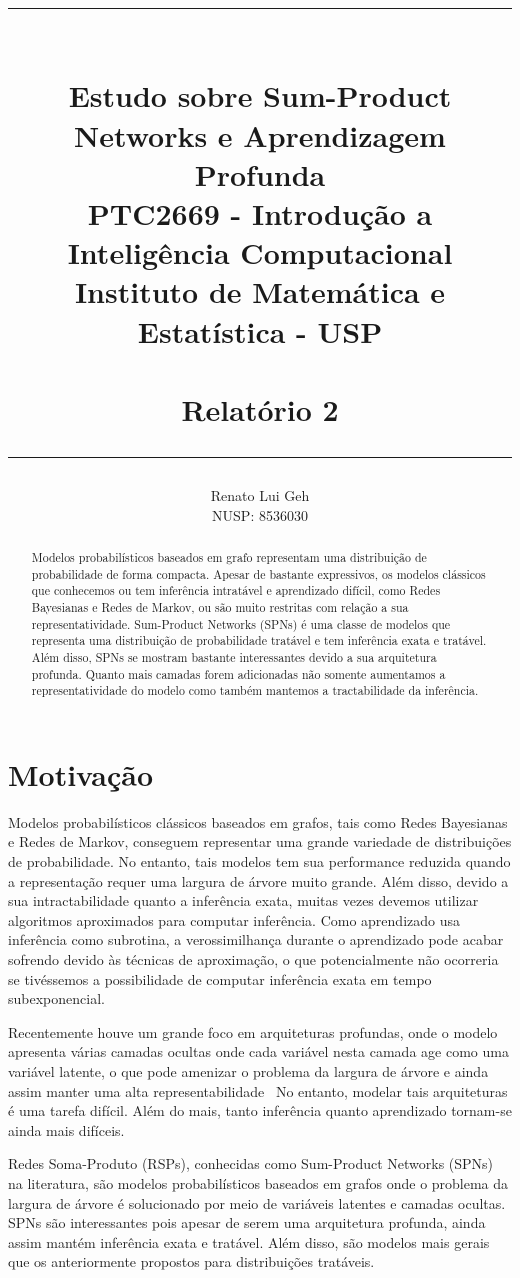 \documentclass{amsart}
\title{%
  \noindent\rule{10cm}{0.8pt}\\
  Estudo sobre Sum-Product Networks e Aprendizagem Profunda\\[1ex]
  \scriptsize\mdseries
  PTC2669 - Introdução a Inteligência Computacional\\
  Instituto de Matemática e Estatística - USP\\%
  \tiny~\\
  Relatório 2\\%
  \noindent\rule{10cm}{0.8pt}
}
\author[]{Renato Lui Geh\\NUSP\@: 8536030}
\theoremstyle{plain}
\numberwithin{equation}{section}
\begin{document}
\begin{abstract}
  Modelos probabilísticos baseados em grafo representam uma distribuição de probabilidade de forma
  compacta. Apesar de bastante expressivos, os modelos clássicos que conhecemos ou tem inferência
  intratável e aprendizado difícil, como Redes Bayesianas e Redes de Markov, ou são muito restritas
  com relação a sua representatividade. Sum-Product Networks (SPNs) é uma classe de modelos que
  representa uma distribuição de probabilidade tratável e tem inferência exata e tratável. Além
  disso, SPNs se mostram bastante interessantes devido a sua arquitetura profunda. Quanto mais
  camadas forem adicionadas não somente aumentamos a representatividade do modelo como também
  mantemos a tractabilidade da inferência.
  \vspace*{-3.5em}
\end{abstract}

\maketitle

\section{Motivação}

Modelos probabilísticos clássicos baseados em grafos, tais como Redes Bayesianas e Redes de Markov,
conseguem representar uma grande variedade de distribuições de probabilidade. No entanto, tais
modelos tem sua performance reduzida quando a representação requer uma largura de árvore muito
grande. Além disso, devido a sua intractabilidade quanto a inferência exata, muitas vezes devemos
utilizar algoritmos aproximados para computar inferência. Como aprendizado usa inferência como
subrotina, a verossimilhança durante o aprendizado pode acabar sofrendo devido às técnicas de
aproximação, o que potencialmente não ocorreria se tivéssemos a possibilidade de computar
inferência exata em tempo subexponencial.

Recentemente houve um grande foco em arquiteturas profundas, onde o modelo apresenta várias camadas
ocultas onde cada variável nesta camada age como uma variável latente, o que pode amenizar o
problema da largura de árvore e ainda assim manter uma alta representabilidade~\cite{deep-archs-ai}
No entanto, modelar tais arquiteturas é uma tarefa difícil. Além do mais, tanto inferência quanto
aprendizado tornam-se ainda mais difíceis.

Redes Soma-Produto (RSPs), conhecidas como Sum-Product Networks (SPNs) na literatura, são modelos
probabilísticos baseados em grafos onde o problema da largura de árvore é solucionado por meio de
variáveis latentes e camadas ocultas. SPNs são interessantes pois apesar de serem uma arquitetura
profunda, ainda assim mantém inferência exata e tratável. Além disso, são modelos mais gerais que
os anteriormente propostos para distribuições tratáveis.
\end{document}
